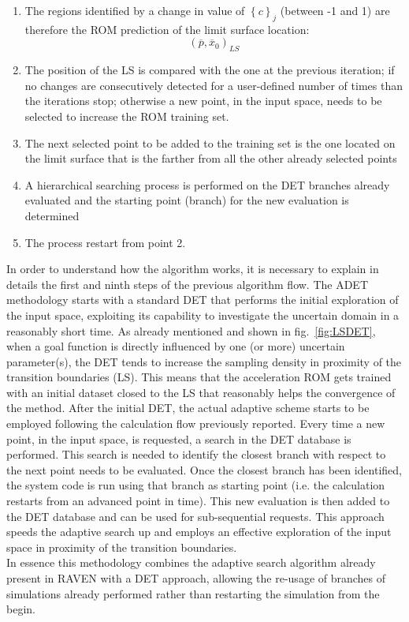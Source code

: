 \begin{enumerate}
\item The regions identified by a change in value of $\left \{ c \right \}_{j}$ (between -1 and 1) are therefore the ROM prediction of the limit surface location:
\begin{equation}
(\overline{p},\overline{x}_{0})_{LS}
\end{equation}
\item The position of the LS is compared with the one at the previous iteration; if no changes are consecutively detected for a user-defined number of times than the iterations stop; otherwise a new point, in the input space, needs to be selected to increase the ROM training set.
\item The next selected point to be added to the training set is the one located on the limit surface that is the farther from all the other already selected points
\item A hierarchical searching process is performed on the DET branches already evaluated and the starting point (branch) for the new evaluation is determined
\item The process restart from point 2.
\end{enumerate}
In order to understand how the algorithm works, it is necessary to explain in details the first and ninth steps of the previous algorithm flow. The ADET methodology starts with a standard DET that performs the initial exploration of the input space, exploiting its capability to investigate the uncertain domain in a reasonably short time. As already mentioned and shown in fig.~\ref{fig:LSDET}, when a goal function is directly influenced by one (or more) uncertain parameter(s), the DET tends to increase the sampling density in proximity of the transition boundaries (LS). This means that the acceleration ROM gets trained with an initial dataset closed to the LS that reasonably helps the convergence of the method. 
After the initial DET, the actual adaptive scheme starts to be employed following the calculation flow previously reported. Every time a new point, in the input space, is requested, a search in the DET database is performed. This search is needed to identify the closest branch with respect to the next point needs to be evaluated. Once the closest branch has been identified, the system code is run using that branch as starting point (i.e. the calculation restarts from an advanced point in time). This new evaluation is then added to the DET database and can be used for sub-sequential requests. This approach speeds the adaptive search up and employs an effective exploration of the input space in proximity of the transition boundaries.
\\ In essence this methodology combines the adaptive search algorithm already present in RAVEN with a DET approach, allowing the re-usage of branches of simulations already performed rather than restarting the simulation from the begin.


